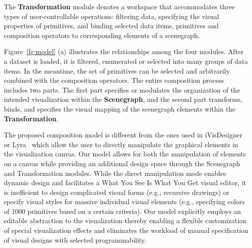 The \textbf{Transformation} module denotes a workspace that accommodates three types of user-controllable operations: filtering data, specifying the visual properties of primitives, and binding selected data items, primitives and composition operators to corresponding elements of a scenegraph.


    Figure~\ref{fg:model} (a) illustrates the relationships among the four modules. After a dataset is loaded, it is filtered, enumerated or selected into many groups of data items. In the meantime, the set of primitives can be selected and arbitrarily combined with the composition operators. The entire composition process includes two parts. The first part specifies or modulates the organization of the intended visualization within the \textbf{Scenegraph}, and the second part transforms, binds, and specifies the visual mapping of the scenegraph elements within the \textbf{Transformation}.

The proposed composition model is different from the ones used in iVisDesigner~\cite{Yuan:2014:TVCG} or Lyra~\cite{Heer:2014:CGF} which allow the user to directly manipulate the graphical elements in the visualization canvas.  Our model allows for both the manipulation of elements on a canvas while providing an additional design space through the Scenegraph and Transformation modules. While the direct manipulation mode enables dynamic design and facilitates a What You See Is What You Get visual editor, it is inefficient to design complicated visual forms (e.g., recursive drawings) or specify visual styles for massive individual visual elements (e.g., specifying colors of 1000 primitives based on a certain criteria). Our model explicitly employs an editable abstraction to the visualization thereby enabling a flexible customization of special visualization effects and eliminates the workload of manual specification of visual designs with selected programmability.

